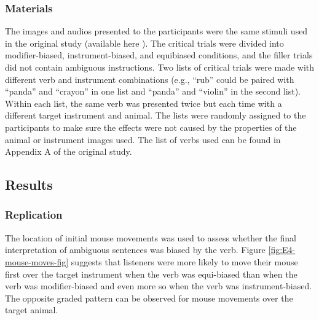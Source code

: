 \documentclass[
  man,floatsintext]{apa6}
\begin{document}
\hypertarget{materials-1}{%
\subsubsection{Materials}\label{materials-1}}

The images and audios presented to the participants were the same
stimuli used in the original study (available here ). The critical
trials were divided into modifier-biased, instrument-biased, and
equibiased conditions, and the filler trials did not contain ambiguous
instructions. Two lists of critical trials were made with different verb
and instrument combinations (e.g., ``rub'' could be paired with ``panda''
and ``crayon'' in one list and ``panda'' and ``violin'' in the second list).
Within each list, the same verb was presented twice but each time with a
different target instrument and animal. The lists were randomly assigned
to the participants to make sure the effects were not caused by the
properties of the animal or instrument images used. The list of verbs
used can be found in Appendix A of the original study.

\hypertarget{results-3}{%
\subsection{Results}\label{results-3}}

\hypertarget{replication-1}{%
\subsubsection{Replication}\label{replication-1}}

The location of initial mouse movements was used to assess whether the final interpretation of ambiguous sentences was biased by the verb. Figure \ref{fig:E4-mouse-moves-fig} suggests that listeners were more likely to move their mouse first over the target instrument when the verb was equi-biased than when the verb was modifier-biased and even more so when the verb was instrument-biased. The opposite graded pattern can be observed for mouse movements over the target animal.
\end{document}
